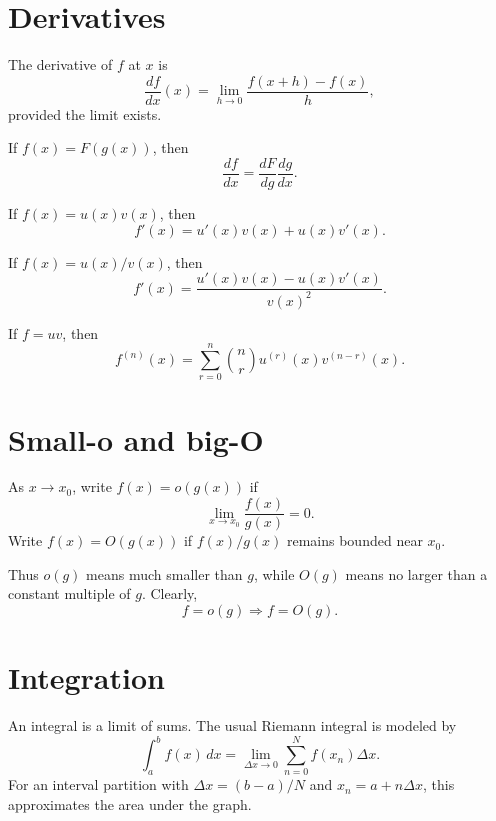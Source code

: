 \section{Derivatives}

\begin{definition}
The derivative of \(f\) at \(x\) is
\[
  \frac{df}{dx}(x)=\lim_{h\to0}\frac{f(x+h)-f(x)}{h},
\]
provided the limit exists.
\end{definition}

\begin{theorem}
If \(f(x)=F(g(x))\), then
\[
  \frac{df}{dx}=\frac{dF}{dg}\frac{dg}{dx}.
\]
\end{theorem}

\begin{theorem}
If \(f(x)=u(x)v(x)\), then
\[
  f'(x)=u'(x)v(x)+u(x)v'(x).
\]
\end{theorem}

\begin{theorem}
If \(f(x)=u(x)/v(x)\), then
\[
  f'(x)=\frac{u'(x)v(x)-u(x)v'(x)}{v(x)^2}.
\]
\end{theorem}

\begin{theorem}
If \(f=uv\), then
\[
  f^{(n)}(x)=\sum_{r=0}^n \binom{n}{r}u^{(r)}(x)v^{(n-r)}(x).
\]
\end{theorem}

\section{Small-o and big-O}

\begin{definition}
As \(x\to x_0\), write \(f(x)=o(g(x))\) if
\[
  \lim_{x\to x_0}\frac{f(x)}{g(x)}=0.
\]
Write \(f(x)=O(g(x))\) if \(f(x)/g(x)\) remains bounded near \(x_0\).
\end{definition}

Thus \(o(g)\) means much smaller than \(g\), while \(O(g)\) means no larger than a constant multiple of \(g\).  Clearly,
\[
  f=o(g)\Rightarrow f=O(g).
\]

\section{Integration}

An integral is a limit of sums.  The usual Riemann integral is modeled by
\[
  \int_a^b f(x)\,dx=\lim_{\Delta x\to0}\sum_{n=0}^{N}f(x_n)\Delta x.
\]
For an interval partition with \(\Delta x=(b-a)/N\) and \(x_n=a+n\Delta x\), this approximates the area under the graph.

